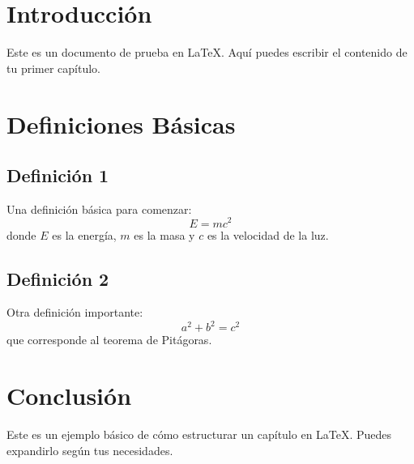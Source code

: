 \section{Introducción}
Este es un documento de prueba en \LaTeX. Aquí puedes escribir el contenido de tu primer capítulo.

\section{Definiciones Básicas}
\subsection{Definición 1}
Una definición básica para comenzar:
\[
E = mc^2
\]
donde $E$ es la energía, $m$ es la masa y $c$ es la velocidad de la luz.

\subsection{Definición 2}
Otra definición importante:
\[
a^2 + b^2 = c^2
\]
que corresponde al teorema de Pitágoras.

\section{Conclusión}
Este es un ejemplo básico de cómo estructurar un capítulo en \LaTeX. Puedes expandirlo según tus necesidades.